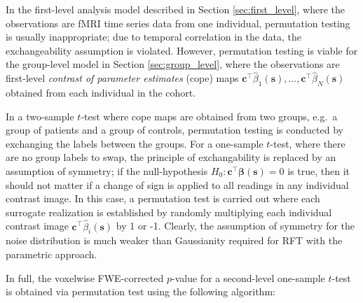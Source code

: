 In the first-level analysis model described in Section \ref{sec:first_level}, where the observations are fMRI time series data from one individual, permutation testing is usually inappropriate; due to temporal correlation in the data, the exchangeability assumption is violated. However, permutation testing is viable for the group-level model in Section \ref{sec:group_level}, where the observations are first-level \textit{contrast of parameter estimates} (cope) maps $\bm{c}^{\intercal}\hat{\beta}_{1}(\bm{s}), ..., \bm{c}^{\intercal}\hat{\beta}_{N}(\bm{s})$ obtained from each individual in the cohort.

In a two-sample $t$-test where cope maps are obtained from two groups, e.g.\ a group of patients and a group of controls, permutation testing is conducted by exchanging the labels between the groups. For a one-sample $t$-test, where there are no group labels to swap, the principle of exchangability is replaced by an assumption of symmetry; if the null-hypothesis $H_{0} : \bm{c}^{\intercal}\bm{\beta}(\bm{s}) = 0$ is true, then it should not matter if a change of sign is applied to all readings in any individual contrast image. In this case, a permutation test is carried out where each surrogate realization is established by randomly multiplying each individual contrast image $\bm{c}^{\intercal}\hat{\beta}_{i}(\bm{s})$ by 1 or -1. Clearly, the assumption of symmetry for the noise distribution is much weaker than Gaussianity required for RFT with the parametric approach.

In full, the voxelwise FWE-corrected $p$-value for a second-level one-sample $t$-test is obtained via permutation test using the following algorithm: 


